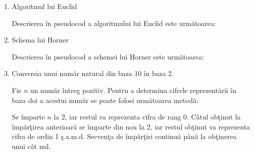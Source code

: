 \documentclass{article}
\begin{document}
\begin{enumerate}
	\item Algoritmul lui Euclid

	Descrierea în pseudocod a algoritmului lui Euclid este următoarea:


	\item Schema lui Horner
	
	Descrierea în pseudocod a schemei lui Horner este următoarea:


	\item Conversia unui număr natural din baza 10 în baza 2.

	Fie $n$ un număr întreg pozitiv. Pentru a determina cifrele reprezentării în baza doi a acestui număr se poate folosi următoarea metodă:

	Se împarte $n$ la 2, iar restul va reprezenta cifra de rang 0. Câtul obţinut la împărţirea anterioară se împarte din nou la 2, iar restul obţinut va reprezenta cifra de ordin 1 ş.a.m.d. Secvenţa de împărţiri continuă până la obţinerea unui cât nul.


\end{enumerate}
\end{document}
